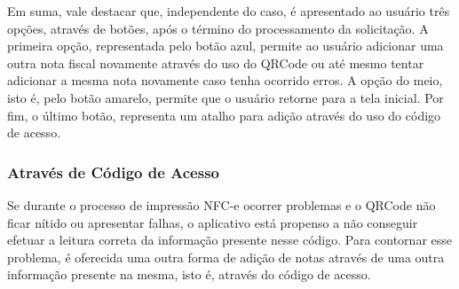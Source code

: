 \newpage
Em suma, vale destacar que, independente do caso, é apresentado ao usuário três opções, através de botões, após o término do processamento da solicitação. A primeira opção, representada pelo botão azul, permite ao usuário adicionar uma outra nota fiscal novamente através do uso do QRCode ou até mesmo tentar adicionar a mesma nota novamente caso tenha ocorrido erros. A opção do meio, isto é, pelo botão amarelo, permite que o usuário retorne para a tela inicial. Por fim, o último botão, representa um atalho para adição através do uso do código de acesso.

\subsubsection{Através de Código de Acesso}

Se durante o processo de impressão NFC-e ocorrer problemas e o QRCode não ficar nítido ou apresentar falhas, o aplicativo está propenso a não conseguir efetuar a leitura correta da informação presente nesse código. Para contornar esse problema, é oferecida uma outra forma de adição de notas através de uma outra informação presente na mesma, isto é, através do código de acesso.

